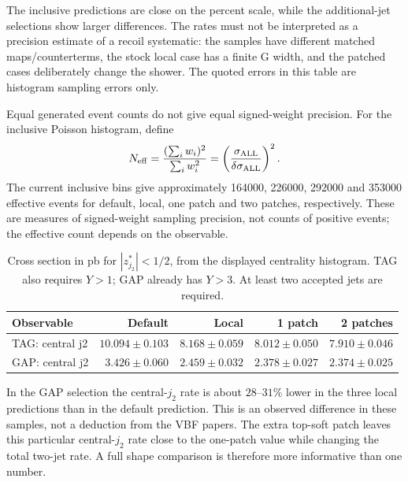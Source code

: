 \documentclass[11pt,a4paper]{article}
\begin{document}
The inclusive predictions are close on the percent scale, while the
additional-jet selections show larger differences. The rates must not be
interpreted as a precision estimate of a recoil systematic: the samples
have different matched maps/counterterms, the stock local case has a finite
G width, and the patched cases deliberately change the shower. The quoted
errors in this table are histogram sampling errors only.

Equal generated event counts do not give equal signed-weight precision.
For the inclusive Poisson histogram, define
\begin{equation}
 N_{\rm eff}=\frac{(\sum_i w_i)^2}{\sum_i w_i^2}
            =\left(\frac{\sigma_{\rm ALL}}
                         {\delta\sigma_{\rm ALL}}\right)^2.
\end{equation}
The current inclusive bins give approximately 164000, 226000, 292000 and
353000 effective events for default, local, one patch and two patches,
respectively. These are measures of signed-weight sampling precision, not
counts of positive events; the effective count depends on the observable.

\begin{table}[htbp]
\centering\small
\begin{tabular}{@{}lrrrr@{}}
\toprule
Observable & Default & Local & 1 patch & 2 patches\\
\midrule
TAG: central j2 & $10.094\pm0.103$ & $8.168\pm0.059$ & $8.012\pm0.050$ & $7.910\pm0.046$ \\
GAP: central j2 & $3.426\pm0.060$ & $2.459\pm0.032$ & $2.378\pm0.027$ & $2.374\pm0.025$ \\
\bottomrule
\end{tabular}
\caption{Cross section in pb for $|z^*_{j_2}|<1/2$, from the displayed centrality histogram. TAG also requires $Y>1$; GAP already has $Y>3$. At least two accepted jets are required.}\label{tab:central}
\end{table}


In the GAP selection the central-$j_2$ rate is about $28$--$31\%$ lower in
the three local predictions than in the default prediction. This is an
observed difference in these samples, not a deduction from the VBF papers.
The extra top-soft patch leaves this particular central-$j_2$ rate close
to the one-patch value while changing the total two-jet rate. A full shape
comparison is therefore more informative than one number.
\end{document}
